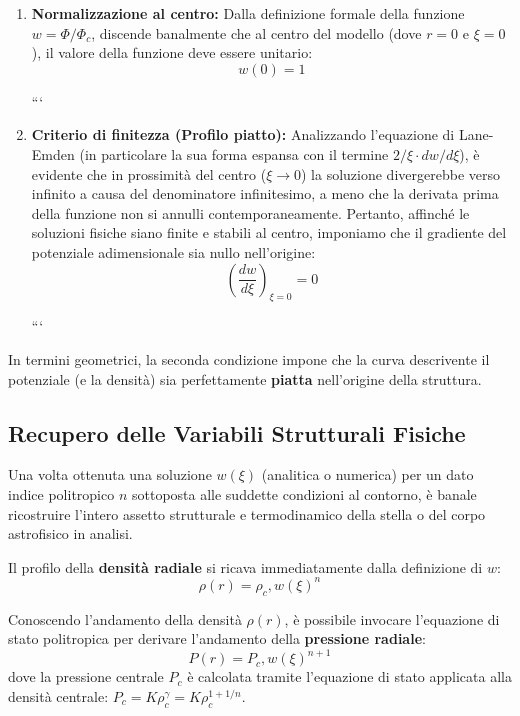 \begin{enumerate}
\item \textbf{Normalizzazione al centro:} Dalla definizione formale della funzione $w = \Phi / \Phi_c$, discende banalmente che al centro del modello (dove $r=0$ e $\xi=0$), il valore della funzione deve essere unitario:
\begin{equation}
w(0) = 1
\end{equation}

```
\item \textbf{Criterio di finitezza (Profilo piatto):} Analizzando l'equazione di Lane-Emden (in particolare la sua forma espansa con il termine $2/\xi \cdot dw/d\xi$), è evidente che in prossimità del centro ($\xi \to 0$) la soluzione divergerebbe verso infinito a causa del denominatore infinitesimo, a meno che la derivata prima della funzione non si annulli contemporaneamente. Pertanto, affinché le soluzioni fisiche siano finite e stabili al centro, imponiamo che il gradiente del potenziale adimensionale sia nullo nell'origine:
\begin{equation}
    \left( \frac{dw}{d\xi} \right)_{\xi=0} = 0
\end{equation}

```

\end{enumerate}
In termini geometrici, la seconda condizione impone che la curva descrivente il potenziale (e la densità) sia perfettamente \textbf{piatta} nell'origine della struttura.

\subsection{Recupero delle Variabili Strutturali Fisiche}

Una volta ottenuta una soluzione $w(\xi)$ (analitica o numerica) per un dato indice politropico $n$ sottoposta alle suddette condizioni al contorno, è banale ricostruire l'intero assetto strutturale e termodinamico della stella o del corpo astrofisico in analisi.

Il profilo della \textbf{densità radiale} si ricava immediatamente dalla definizione di $w$:
\begin{equation}
\rho(r) = \rho_c , w(\xi)^n
\end{equation}

Conoscendo l'andamento della densità $\rho(r)$, è possibile invocare l'equazione di stato politropica per derivare l'andamento della \textbf{pressione radiale}:
\begin{equation}
P(r) = P_c , w(\xi)^{n+1}
\end{equation}
dove la pressione centrale $P_c$ è calcolata tramite l'equazione di stato applicata alla densità centrale: $P_c = K \rho_c^\gamma = K \rho_c^{1+1/n}$.

